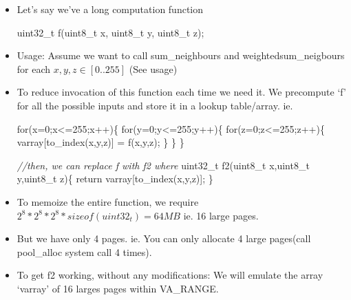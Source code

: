 \documentclass[]{article}
\newenvironment{Shaded}{}{}
\newcommand{\DataTypeTok}[1]{\textcolor[rgb]{0.50,0.00,0.00}{{#1}}}
\newcommand{\DecValTok}[1]{\textcolor[rgb]{0.00,0.00,1.00}{{#1}}}
\newcommand{\CommentTok}[1]{\textcolor[rgb]{0.50,0.50,0.50}{\textit{{#1}}}}
\newcommand{\ControlFlowTok}[1]{{#1}}
\newcommand{\NormalTok}[1]{{#1}}
\begin{document}
\begin{itemize}
\item
  Let's say we've a long computation function

\begin{Shaded}
\begin{Highlighting}[]
  \DataTypeTok{uint32_t} \NormalTok{f(}\DataTypeTok{uint8_t} \NormalTok{x, }\DataTypeTok{uint8_t} \NormalTok{y, }\DataTypeTok{uint8_t} \NormalTok{z);}
\end{Highlighting}
\end{Shaded}
\item
  Usage: Assume we want to call sum\_neighbours and
  weightedsum\_neigbours for each \(x,y,z \in [0..255]\) (See usage)
\item
  To reduce invocation of this function each time we need it. We
  precompute `f' for all the possible inputs and store it in a lookup
  table/array. ie.

\begin{Shaded}
\begin{Highlighting}[]
\ControlFlowTok{for}\NormalTok{(x=}\DecValTok{0}\NormalTok{;x<=}\DecValTok{255}\NormalTok{;x++)\{}
 \ControlFlowTok{for}\NormalTok{(y=}\DecValTok{0}\NormalTok{;y<=}\DecValTok{255}\NormalTok{;y++)\{}
  \ControlFlowTok{for}\NormalTok{(z=}\DecValTok{0}\NormalTok{;z<=}\DecValTok{255}\NormalTok{;z++)\{}
    \NormalTok{varray[to_index(x,y,z)] = f(x,y,z);}
  \NormalTok{\}}
 \NormalTok{\}}
\NormalTok{\}}

\CommentTok{//then, we can replace f with f2 where}
\DataTypeTok{uint32_t} \NormalTok{f2(}\DataTypeTok{uint8_t} \NormalTok{x,}\DataTypeTok{uint8_t} \NormalTok{y,}\DataTypeTok{uint8_t} \NormalTok{z)\{}
  \ControlFlowTok{return} \NormalTok{varray[to_index(x,y,z)];}
\NormalTok{\}}
\end{Highlighting}
\end{Shaded}
\item
  To memoize the entire function, we require
  \(2^8 * 2^8 * 2^8 * sizeof(uint32_t) = 64MB\) ie. 16 large pages.
\item
  But we have only 4 pages. ie. You can only allocate 4 large pages(call
  pool\_alloc system call 4 times).
\item
  To get f2 working, without any modifications: We will emulate the
  array `varray' of 16 larges pages within VA\_RANGE.


\end{itemize}
\end{document}
